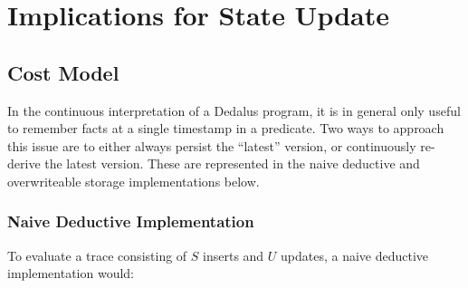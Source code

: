 \section{Implications for State Update}

\subsection{Cost Model}


In the continuous interpretation of a Dedalus program, it is in general only
useful to remember facts at a single timestamp in a predicate.  Two ways to
approach this issue are to either always persist the ``latest'' version, or
continuously re-derive the latest version.  These are represented in the naive
deductive and overwriteable storage implementations below.



\subsubsection{Naive Deductive Implementation}

To evaluate a trace consisting of $S$ inserts and $U$ updates, a naive
deductive implementation would:

